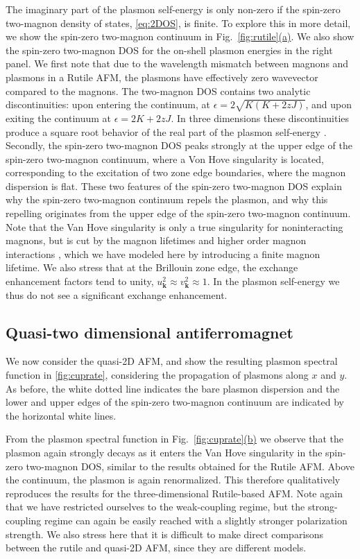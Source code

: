 \documentclass[aps,prb,reprint,twocolumns,superscriptaddress,nofootinbib]{revtex4-2}
\newcommand{\subfigref}[2]{Fig.~\hyperref[#1]{\ref*{#1}#2}}
\begin{document}
	The imaginary part of the plasmon self-energy is only non-zero if the spin-zero two-magnon density of states, \cref{eq:2DOS}, is finite. To explore this in more detail, we show the spin-zero two-magnon continuum in \subfigref{fig:rutile}{(a)}. We also show the spin-zero two-magnon DOS for the on-shell plasmon energies in the right panel. 
	We first note that due to the wavelength mismatch between magnons and plasmons in a Rutile AFM, the plasmons have effectively zero wavevector compared to the magnons.  The two-magnon DOS contains two analytic discontinuities: upon entering the continuum, at $\epsilon=2\sqrt{K(K+2zJ)}$, and upon exiting the continuum at $\epsilon=2K+2zJ$. In three dimensions these discontinuities produce a square root behavior of the real part of the plasmon self-energy \cite{chernyshevSpinWavesTriangular2009,zhitomirskyColloquiumSpontaneousMagnon2013}. Secondly, the spin-zero two-magnon DOS peaks strongly at the upper edge of the spin-zero two-magnon continuum, where a Von Hove singularity is located, corresponding to the excitation of two zone edge boundaries, where the magnon dispersion is flat. 
	These two features of the spin-zero two-magnon DOS explain why the spin-zero two-magnon continuum repels the plasmon, and why this repelling originates from the upper edge of the spin-zero two-magnon continuum. Note that the Van Hove singularity is only a true singularity for noninteracting magnons, but is cut by the magnon lifetimes \cite{bayrakciLifetimesAntiferromagneticMagnons2013} and higher order magnon interactions \cite{canaliTheoryRamanScattering1992}, which we have modeled here by introducing a finite magnon lifetime. We also stress that at the Brillouin zone edge, the exchange enhancement factors tend to unity, $u_{\bm k}^2\approx v_{\bm k}^2 \approx1$.  In the plasmon self-energy we thus do not see a significant exchange enhancement.
	
	
	\subsection{Quasi-two dimensional antiferromagnet}
	
	We now consider the quasi-2D AFM, and show the resulting plasmon spectral function in \cref{fig:cuprate}, considering the propagation of plasmons along $ x$ and $ y$. As before, the white dotted line indicates the bare plasmon dispersion and the lower and upper edges of the spin-zero two-magnon continuum are indicated by the horizontal white lines. 
	
	
	From the plasmon spectral function in \subfigref{fig:cuprate}{(b)} we observe that the plasmon again strongly decays as it enters the Van Hove singularity in the spin-zero two-magnon DOS, similar to the results obtained for the Rutile AFM. Above the continuum, the plasmon is again renormalized. This therefore qualitatively reproduces the results for the three-dimensional Rutile-based AFM. Note again that we have restricted ourselves to the weak-coupling regime, but the strong-coupling regime can again be easily reached with a slightly stronger polarization strength. We also stress here that it is difficult to make direct comparisons between the rutile and quasi-2D AFM, since they are different models.
	
\end{document}

